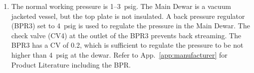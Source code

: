 \begin{enumerate}
    \item The normal working pressure is 1--3~psig. 
    The Main Dewar is a vacuum jacketed vessel, but the top plate is not insulated. 
    A back pressure regulator (BPR3) set to 4~psig is used to regulate the pressure in the Main Dewar.
    The check valve (CV4) at the outlet of the BPR3 prevents back streaming. 
    The BPR3 has a CV of 0.2, which is sufficient to regulate the pressure to be not higher than 
    4~psig at the dewar. Refer to App.~\ref{app:manufacturer} for Product Literature including the BPR.
\end{enumerate}
